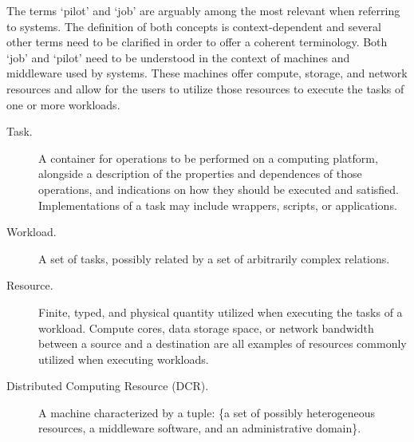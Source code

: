 \documentclass{sig-alternate}
\begin{document}

The terms `pilot' and `job' are arguably among the most relevant when referring
to \pilotjob systems. The definition of both concepts is context-dependent and
several other terms need to be clarified in order to offer a coherent
terminology. Both `job' and `pilot' need to be understood in the context of
machines and middleware used by \pilotjob systems. These machines offer compute,
storage, and network resources and \pilots allow for the users to utilize those
resources to execute the tasks of one or more workloads.

\begin{description}

\item[Task.] A container for operations to be performed on a computing platform,
alongside a description of the properties and dependences of those operations,
and indications on how they should be executed and satisfied. Implementations of
a task may include wrappers, scripts, or applications.

\item[Workload.] A set of tasks, possibly related by a set of arbitrarily
complex relations.

\item[Resource.] Finite, typed, and physical quantity utilized when executing
the tasks of a workload. Compute cores, data storage space, or network bandwidth
between a source and a destination are all examples of resources commonly
utilized when executing workloads.

\item[Distributed Computing Resource (DCR).] A machine characterized by a tuple:
\{a set of possibly heterogeneous resources, a middleware software, and an
administrative domain\}.


\end{description}

\end{document}
